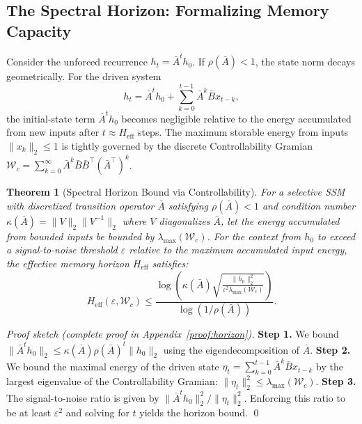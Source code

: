 \documentclass[10pt,twocolumn]{article}
\newtheorem{theorem}{Theorem}
\begin{document}
\subsection{The Spectral Horizon: Formalizing Memory Capacity}

Consider the unforced recurrence $h_t = \bar{A}^t h_0$. If $\rho(\bar{A})<1$, the state norm decays geometrically. For the driven system
\begin{equation}
h_t = \bar{A}^t h_0 + \sum_{k=0}^{t-1} \bar{A}^k \bar{B} x_{t-k},
\label{eq:unrolled}
\end{equation}
the initial-state term $\bar{A}^t h_0$ becomes negligible relative to the energy accumulated from new inputs after $t \approx H_{\text{eff}}$ steps. The maximum storable energy from inputs $\|x_k\|_2 \le 1$ is tightly governed by the discrete Controllability Gramian $\mathcal{W}_c = \sum_{k=0}^{\infty} \bar{A}^k \bar{B} \bar{B}^\top (\bar{A}^\top)^k$.

\begin{theorem}[Spectral Horizon Bound via Controllability]
\label{thm:horizon}
For a selective SSM with discretized transition operator $\bar{A}$ satisfying $\rho(\bar{A})<1$ and condition number $\kappa(\bar{A}) = \|V\|_2 \|V^{-1}\|_2$ where $V$ diagonalizes $\bar{A}$, let the energy accumulated from bounded inputs be bounded by $\lambda_{\max}(\mathcal{W}_c)$. For the context from $h_0$ to exceed a signal-to-noise threshold $\varepsilon$ relative to the maximum accumulated input energy, the effective memory horizon $H_{\text{eff}}$ satisfies:
\begin{equation}
H_{\text{eff}}(\varepsilon, \mathcal{W}_c) \le \frac{\log\left( \kappa(\bar{A}) \sqrt{\frac{\|h_0\|_2^2}{\varepsilon^2 \lambda_{\max}(\mathcal{W}_c)}} \right)}{\log(1/\rho(\bar{A}))}.
\label{eq:horizon_main}
\end{equation}
\end{theorem}

\begin{proof}[Proof sketch (complete proof in Appendix~\ref{proof:horizon})]
\textbf{Step 1.} We bound $\|\bar{A}^t h_0\|_2 \le \kappa(\bar{A}) \rho(\bar{A})^t \|h_0\|_2$ using the eigendecomposition of $\bar{A}$.
\textbf{Step 2.} We bound the maximal energy of the driven state $\eta_t = \sum_{k=0}^{t-1} \bar{A}^k \bar{B} x_{t-k}$ by the largest eigenvalue of the Controllability Gramian: $\|\eta_t\|_2^2 \le \lambda_{\max}(\mathcal{W}_c)$.
\textbf{Step 3.} The signal-to-noise ratio is given by $\|\bar{A}^t h_0\|_2^2 / \|\eta_t\|_2^2$. Enforcing this ratio to be at least $\varepsilon^2$ and solving for $t$ yields the horizon bound. \qed
\end{proof}
\end{document}
